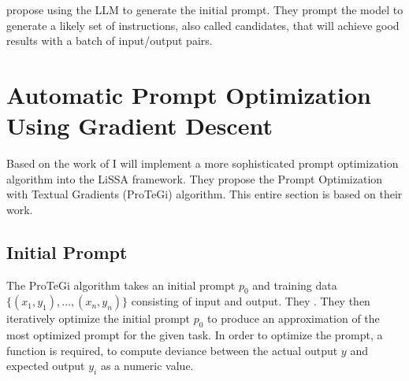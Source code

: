  propose using the LLM to generate the initial prompt. They prompt the model to generate a likely set of instructions, also called candidates, that will achieve good results with a batch of input/output pairs.




\section{Automatic Prompt Optimization Using Gradient Descent}
\label{sec:gradient_descent}
Based on the work of  I will implement a more sophisticated prompt optimization algorithm into the LiSSA framework. They propose the Prompt Optimization with Textual Gradients (ProTeGi) algorithm. This entire section is based on their work.

\subsection{Initial Prompt}
The ProTeGi algorithm takes an initial prompt $p_0$ and training data $\{(x_1, y_1), \dots, (x_n, y_n)\}$ consisting of input and output. They . They then iteratively optimize the initial prompt $p_0$ to produce an approximation of the most optimized prompt for the given task. In order to optimize the prompt, a function is required, to compute deviance between the actual output $y$ and expected output $y_i$ as a numeric value.

